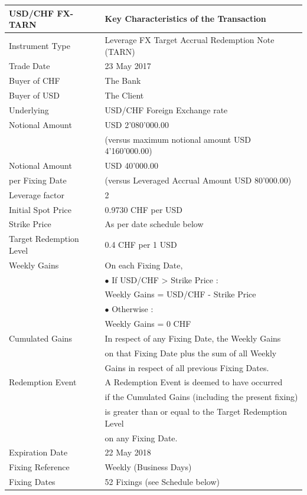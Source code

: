 \begin{longtable}{|l|l|} 
\hline
\textbf{USD/CHF FX-TARN} & \textbf{Key Characteristics of the Transaction} \\
\hline 
\hline
Instrument Type & Leverage FX Target Accrual Redemption Note (TARN) \\
\hline
Trade Date & 23 May 2017\\
\hline
Buyer of CHF & The Bank \\
\hline
Buyer of USD & The Client \\
\hline
Underlying & USD/CHF Foreign Exchange rate\\
\hline
Notional Amount & USD 2'080'000.00 \\
&(versus maximum notional amount USD 4'160'000.00)\\
\hline
Notional Amount & USD 40'000.00\\
per Fixing Date &(versus Leveraged Accrual Amount USD 80'000.00)\\
\hline
Leverage factor &2\\
\hline
Initial Spot Price & 0.9730 CHF per USD\\
\hline
Strike Price & As per date schedule below\\
\hline
Target Redemption Level & 0.4 CHF per 1 USD\\
\hline
Weekly Gains & On each Fixing Date, \\
& $\bullet$ If USD/CHF > Strike Price :\\
& \qquad Weekly Gains = USD/CHF - Strike Price\\ 
& $\bullet$ Otherwise :\\
& \qquad Weekly Gains = 0 CHF\\
\hline
Cumulated Gains & In respect of any Fixing Date, the Weekly Gains \\
& on that Fixing Date plus the sum of all Weekly \\
& Gains in respect of all previous Fixing Dates.\\
\hline
Redemption Event & A Redemption Event is deemed to have occurred \\
& if the Cumulated Gains (including the present fixing)\\ 
& is greater than or equal to the Target Redemption Level\\ 
& on any Fixing Date.\\
\hline
Expiration Date & 22 May 2018 \\
\hline
Fixing Reference & Weekly (Business Days)\\
\hline
Fixing Dates & 52 Fixings (see Schedule below)\\

\end{longtable}
